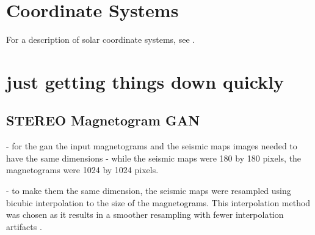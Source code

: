 \documentclass[11pt,a4paper,onecolumn]{report}
\begin{document}





\appendix

\chapter{Coordinate Systems}
For a description of solar coordinate systems, see \citet{thompson_w_t_coordinate_2006}.


\chapter{just getting things down quickly}



\section{STEREO Magnetogram GAN}
- for the gan the input magnetograms and the seismic maps images needed to have
the same dimensions
- while the seismic maps were 180 by 180 pixels, the magnetograms were 1024 by
1024 pixels.




- to make them the same dimension, the seismic maps were resampled using bicubic
interpolation to the size of the magnetograms. This interpolation method was
chosen as it results in a smoother resampling with fewer interpolation artifacts
\citep{keys_cubic_1981}.

 
\end{document}
